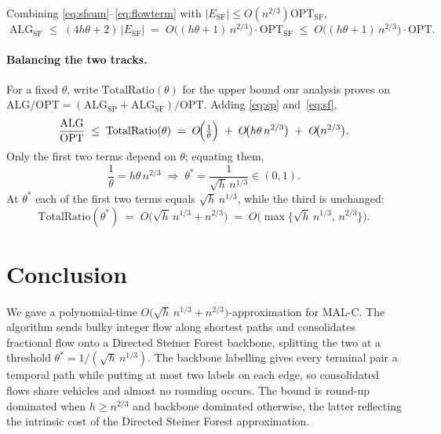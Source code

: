 \documentclass[11pt]{article}
\theoremstyle{definition}
\theoremstyle{remark}
\newcommand{\OPT}{\mathrm{OPT}}
\newcommand{\OPTSF}{\OPT_{\mathrm{SF}}}
\newcommand{\ALG}{\mathrm{ALG}}
\newcommand{\ALGSP}{\ALG_{\mathrm{SP}}}
\newcommand{\ALGSF}{\ALG_{\mathrm{SF}}}
\newcommand{\ESF}{E_{\mathrm{SF}}}
\begin{document}
Combining \eqref{eq:sfsum}--\eqref{eq:flowterm} with $|\ESF|\le O(n^{2/3})\OPTSF$,
\begin{equation}\label{eq:sf}
  \boxed{\;\ALGSF \;\le\; (4h\theta+2)\,|\ESF|
  \;=\; O\!\bigl((h\theta+1)\,n^{2/3}\bigr)\cdot\OPTSF
  \;\le\; O\!\bigl((h\theta+1)\,n^{2/3}\bigr)\cdot\OPT.\;}
\end{equation}

\paragraph{Balancing the two tracks.} For a fixed $\theta$, write $\mathrm{TotalRatio}(\theta)$ for the
upper bound our analysis proves on $\ALG/\OPT=(\ALGSP+\ALGSF)/\OPT$. Adding \eqref{eq:sp}
and~\eqref{eq:sf},
\begin{equation}\label{eq:total}
  \frac{\ALG}{\OPT}\;\le\;\mathrm{TotalRatio}(\theta)
  \;=\; O\!\Bigl(\tfrac1\theta\Bigr)\;+\;O\!\bigl(h\theta\,n^{2/3}\bigr)\;+\;O\!\bigl(n^{2/3}\bigr).
\end{equation}
Only the first two terms depend on $\theta$; equating them,
\begin{equation}\label{eq:thetastar}
  \frac1\theta = h\theta\,n^{2/3}
  \;\Longrightarrow\; \theta^\ast=\frac{1}{\sqrt{h}\,n^{1/3}}\in(0,1).
\end{equation}
At $\theta^\ast$ each of the first two terms equals $\sqrt{h}\,n^{1/3}$, while the third is unchanged:
\begin{equation}\label{eq:final}
  \boxed{\;\mathrm{TotalRatio}(\theta^\ast)
  \;=\; O\!\bigl(\sqrt{h}\,n^{1/3}+n^{2/3}\bigr)
  \;=\; O\!\bigl(\max\{\sqrt{h}\,n^{1/3},\,n^{2/3}\}\bigr).\;}
\end{equation}


\section{Conclusion}\label{sec:conclusion}

We gave a polynomial-time $O\!\bigl(\sqrt{h}\,n^{1/3}+n^{2/3}\bigr)$-approximation for MAL-C. The
algorithm sends bulky integer flow along shortest paths and consolidates fractional flow onto a
Directed Steiner Forest backbone, splitting the two at a threshold $\theta^\ast=1/(\sqrt{h}\,n^{1/3})$.
The backbone labelling gives every terminal pair a temporal path while putting at most two labels on each edge, so consolidated flows share vehicles and almost no rounding occurs. The bound is round-up
dominated when $h\ge n^{2/3}$ and backbone dominated otherwise, the latter reflecting the intrinsic
cost of the Directed Steiner Forest approximation.
\end{document}
